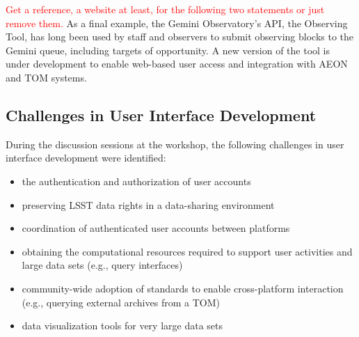 \textcolor{red}{Get a reference, a website at least, for the following two statements or just remove them.}
As a final example, the Gemini Observatory's  {API}, the Observing Tool, has long been used by staff and observers to submit observing blocks to the Gemini queue, including targets of opportunity.
A new version of the tool is under development to enable web-based user access and integration with  {AEON} and  {TOM} systems.

\subsection{Challenges in User Interface Development}\label{ssec:interfaces_challenges}

During the discussion sessions at the workshop, the following challenges in user interface development were identified:
\begin{itemize}
\item the authentication and authorization of user accounts
\item preserving   LSST data rights in a data-sharing environment 
\item coordination of authenticated user accounts between platforms
\item obtaining the computational resources required to support user activities and large data sets (e.g., query interfaces)
\item community-wide adoption of standards to enable cross-platform interaction (e.g., querying external archives from a  {TOM})
\item data visualization tools for very large data sets
\end{itemize}


